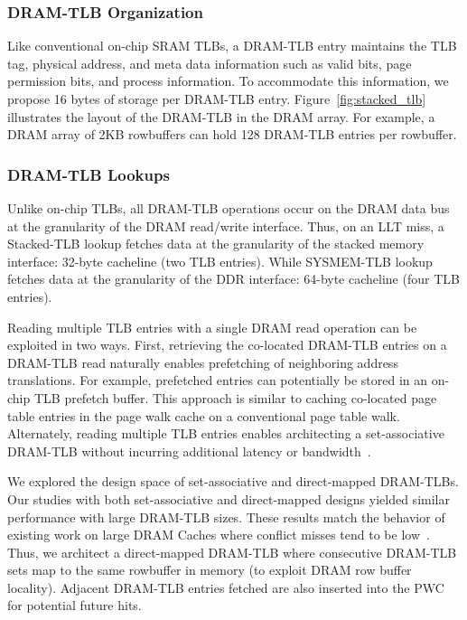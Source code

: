 
\subsubsection{DRAM-TLB Organization}

\noindent Like conventional on-chip SRAM TLBs, a DRAM-TLB entry
maintains the TLB tag, physical address, and meta data information
such as valid bits, page permission bits, and process information. To
accommodate this information, we propose 16 bytes of storage per
DRAM-TLB entry. Figure~\ref{fig:stacked_tlb} illustrates the layout of
the DRAM-TLB in the DRAM array. For example, a DRAM array of 2KB
rowbuffers can hold 128 DRAM-TLB entries per rowbuffer.

\subsubsection{DRAM-TLB Lookups}

\noindent Unlike on-chip TLBs, all DRAM-TLB operations occur on the
DRAM data bus at the granularity of the DRAM read/write interface.
Thus, on an LLT miss, a Stacked-TLB lookup fetches data at the
granularity of the stacked memory interface: 32-byte cacheline (two
TLB entries). While SYSMEM-TLB lookup fetches data at the granularity
of the DDR interface: 64-byte cacheline (four TLB entries).

Reading multiple TLB entries with a single DRAM read operation can be
exploited in two ways. First, retrieving the co-located DRAM-TLB
entries on a DRAM-TLB read naturally enables prefetching of
neighboring address translations. For example, prefetched entries can
potentially be stored in an on-chip TLB prefetch buffer. This approach
is similar to caching co-located page table entries in the page walk
cache on a conventional page table walk. Alternately, reading multiple
TLB entries enables architecting a set-associative DRAM-TLB without
incurring additional latency or bandwidth~\cite{moin2012,loh2011}. 

We explored the design space of set-associative and direct-mapped
DRAM-TLBs. Our studies with both set-associative and direct-mapped
designs yielded similar performance with large DRAM-TLB sizes. These
results match the behavior of existing work on large DRAM Caches where
conflict misses tend to be low~\cite{moin2012}. Thus, we architect a
direct-mapped DRAM-TLB where consecutive DRAM-TLB sets map to the same
rowbuffer in memory (to exploit DRAM row buffer locality). Adjacent
DRAM-TLB entries fetched are also inserted into the PWC for potential
future hits.

